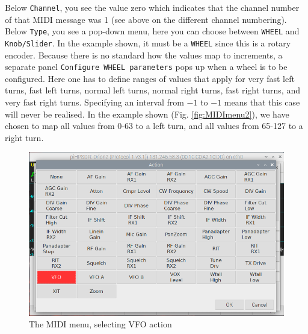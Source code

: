 \documentclass[12pt]{book}
\def\rett#1{\texttt{\color{red}#1}}
\begin{document}
Below \rett{Channel}, you see the value zero which
indicates that the channel number of that MIDI message was 1 (see above on the
different channel numbering). Below \rett{Type}, you see a pop-down menu, here
you can choose between \rett{WHEEL} and \rett{Knob/Slider}. In the example shown,
it must be a \rett{WHEEL} since this is a rotary encoder. Because there is no
standard how the values map to increments, a separate panel
\rett{Configure WHEEL parameters} pops up when a wheel is to be configured.
Here one has to define ranges of values that apply for very fast left turns,
fast left turns, normal left turns, normal right turns, fast right turns,
and very fast right turns. Specifying an interval from $-1$ to $-1$ means that
this case will never be realised. In the example shown (Fig. \ref{fig:MIDImenu2}),
we have chosen to map all values from 0-63 to a left turn, and all values from 65-127
to a right turn.
\begin{figure}[ht!]
\center
\includegraphics[width=12cm]{MIDImenu3.png}
\caption{The MIDI menu, selecting VFO action}
\label{fig:MIDImenu3}
\end{figure}
\end{document}
